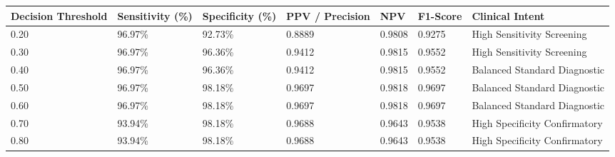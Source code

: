 \begin{tabular}{lllllll}
\toprule
Decision Threshold & Sensitivity (\%) & Specificity (\%) & PPV / Precision & NPV & F1-Score & Clinical Intent \\
\midrule
0.20 & 96.97\% & 92.73\% & 0.8889 & 0.9808 & 0.9275 & High Sensitivity Screening \\
0.30 & 96.97\% & 96.36\% & 0.9412 & 0.9815 & 0.9552 & High Sensitivity Screening \\
0.40 & 96.97\% & 96.36\% & 0.9412 & 0.9815 & 0.9552 & Balanced Standard Diagnostic \\
0.50 & 96.97\% & 98.18\% & 0.9697 & 0.9818 & 0.9697 & Balanced Standard Diagnostic \\
0.60 & 96.97\% & 98.18\% & 0.9697 & 0.9818 & 0.9697 & Balanced Standard Diagnostic \\
0.70 & 93.94\% & 98.18\% & 0.9688 & 0.9643 & 0.9538 & High Specificity Confirmatory \\
0.80 & 93.94\% & 98.18\% & 0.9688 & 0.9643 & 0.9538 & High Specificity Confirmatory \\
\bottomrule
\end{tabular}
